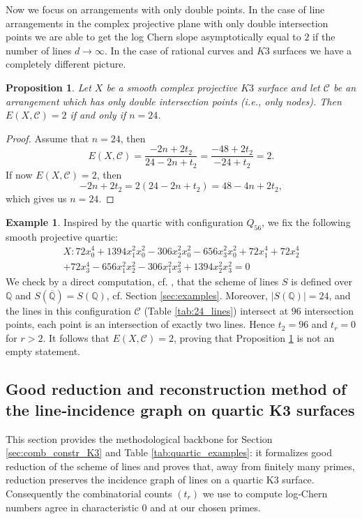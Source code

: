 \documentclass{article}
\theoremstyle{plain}
\newtheorem{proposition}[thm]{Proposition}
\theoremstyle{definition}
\newtheorem{example}[thm]{Example}
\numberwithin{equation}{section}
\begin{document}
Now we focus on arrangements with only double points. In the case of line arrangements in the complex projective plane with only double intersection points we are able to get the log Chern slope asymptotically equal to $2$ if the number of lines $d \rightarrow \infty$. In the case of rational curves and $K3$ surfaces we have a completely different picture.
\begin{proposition}\label{prop:24_lines}
Let $X$ be a smooth complex projective $K3$ surface and let $\mathcal{C}$ be an arrangement which has only double intersection points (i.e., only nodes). Then $E(X,\mathcal{C})=2$ if and only if $n=24$.
\end{proposition}
\begin{proof}
Assume that $n=24$, then
\[E(X,\mathcal{C}) = \frac{-2n+2t_{2}}{24 - 2n + t_{2}} = \frac{-48+2t_{2}}{-24 + t_{2}}=2.\]
If now $E(X,\mathcal{C})=2$, then
\[-2n + 2t_{2} = 2(24 -2n +  t_{2}) = 48 -4n+2t_{2},\]
which gives us $n=24$.
\end{proof}

\begin{example}\label{ex:24_lines}
    Inspired by the quartic \cite[\S 5.2]{Veniani_lines} with configuration $Q_{56}$, we fix the following smooth projective quartic: %
    \[
    \begin{split}
    X:72 x_0^4+1394 x_1^2 x_0^2-306 x_2^2 x_0^2-656 x_3^2 x_0^2+72 x_1^4+72 x_2^4\\
    +72 x_3^4-656 x_1^2 x_2^2-306 x_1^2 x_3^2+1394 x_2^2 x_3^2=0    
    \end{split} \]
    We check by a direct computation, cf. \cite{auxiliary_files}, that the scheme of lines $S$ is defined over $\mathbb{Q}$ and $S(\overline{\mathbb{Q}}) = S(\mathbb{Q})$, cf. Section \ref{sec:examples}. Moreover, $|S(\mathbb{Q})|=24$, and the lines in this configuration $\mathcal{C}$ (Table \ref{tab:24_lines}) intersect at $96$ intersection points, each point is an intersection of exactly two lines. Hence $t_{2}=96$ and $t_{r}=0$ for $r>2$. It follows that $E(X,\mathcal{C})=2$, proving that Proposition \ref{prop:24_lines} is not an empty statement.
\end{example}

\subsection{Good reduction and reconstruction method of the line‑incidence graph on quartic K3 surfaces}

This section provides the methodological backbone for Section \ref{sec:comb_constr_K3} and Table \ref{tab:quartic_examples}: it formalizes good reduction of the scheme of lines and proves that, away from finitely many primes, reduction preserves the incidence graph of lines on a quartic K3 surface. Consequently the combinatorial counts $(t_r)$ we use to compute log‑Chern numbers agree in characteristic 0 and at our chosen primes. 
\end{document}
